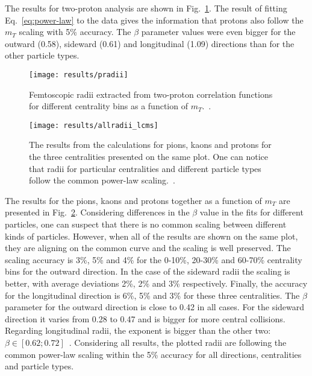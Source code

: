       The results for two-proton analysis are shown in Fig.~\ref{fig:pradii}.
      The result of fitting Eq.~\ref{eq:power-law} to the data gives the information that protons also follow the $m_T$ scaling with 5\% accuracy.
      The $\beta$ parameter values were even bigger for the outward (0.58), sideward (0.61) and longitudinal (1.09) directions than for the other particle types. 

      \begin{figure}[b]
        \centering
        \centerline{\texttt{[image: results/pradii]}}
        \caption{Femtoscopic radii extracted from two-proton correlation functions for different centrality bins as a function of $m_T$.~\cite{galazyn}.}
      \label{fig:pradii}
      \end{figure}

      \begin{figure}[b]
        \centering
        \centerline{\texttt{[image: results/allradii\_lcms]}}
        \caption{The results from the calculations for pions, kaons and protons for the three centralities presented on the same plot. One can notice that radii for particular centralities and different particle types follow the common power-law scaling.~\cite{galazyn}.}
      \label{fig:allradii}
      \end{figure}    

      The results for the pions, kaons and protons together as a function of $m_T$ are presented in Fig.~\ref{fig:allradii}.
      Considering differences in the $\beta$ value in the fits for different particles, one can suspect that there is no common scaling between different kinds of particles.
      However, when all of the results are shown on the same plot, they are aligning on the common curve and the scaling is well preserved.
      The scaling accuracy is 3\%, 5\% and 4\% for the 0-10\%, 20-30\% and 60-70\% centrality bins for the outward direction.
      In the case of the sideward radii the scaling is better, with average deviations 2\%, 2\% and 3\% respectively.
      Finally, the accuracy for the longitudinal direction is 6\%, 5\% and 3\% for these three centralities.
      The $\beta$ parameter for the outward direction is close to 0.42 in all cases.
      For the sideward direction it varies from 0.28 to 0.47 and is bigger for more central collisions.
      Regarding longitudinal radii, the exponent is bigger than the other two: $\beta \in [0.62 ; 0.72]$~.
      Considering all results, the plotted radii are following the common power-law scaling within the 5\% accuracy for all directions, centralities and particle types.
      \FloatBarrier
